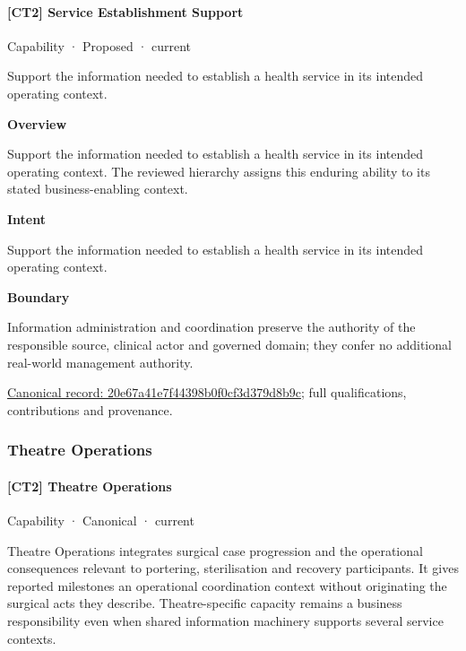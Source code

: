 \paragraph{[CT2] Service Establishment Support}

\label{element:20e67a41e7f44398b0f0cf3d379d8b9c}
{\small Capability · Proposed · current}\par

Support the information needed to establish a health service in its intended operating context.



\textbf{Overview}



Support the information needed to establish a health service in its intended operating context. The reviewed hierarchy assigns this enduring ability to its stated business-enabling context.



\textbf{Intent}



Support the information needed to establish a health service in its intended operating context.



\textbf{Boundary}



Information administration and coordination preserve the authority of the responsible source, clinical actor and governed domain; they confer no additional real-world management authority.


{\footnotesize \href{../../../../continuum/strategy/capability/20e67a41e7f44398b0f0cf3d379d8b9c.md}{Canonical record: 20e67a41e7f44398b0f0cf3d379d8b9c}; full qualifications, contributions and provenance.}\par
\subsubsection{Theatre Operations}

\paragraph{[CT2] Theatre Operations}

\label{element:4bf7a8260e1444fdac44e97c3557b533}
{\small Capability · Canonical · current}\par

Theatre Operations integrates surgical case progression and the operational consequences relevant to portering, sterilisation and recovery participants. It gives reported milestones an operational coordination context without originating the surgical acts they describe. Theatre-specific capacity remains a business responsibility even when shared information machinery supports several service contexts.



